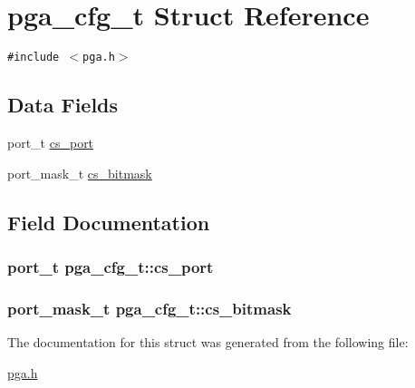 \hypertarget{structpga__cfg__t}{
\section{pga\_\-cfg\_\-t Struct Reference}
\label{structpga__cfg__t}
}
{\tt \#include $<$pga.h$>$}

\subsection*{Data Fields}
\begin{CompactItemize}
\item 
port\_\-t \hyperlink{structpga__cfg__t_7edba9c35b8d722453bd5f6ad115944c}{cs\_\-port}
\item 
port\_\-mask\_\-t \hyperlink{structpga__cfg__t_f6e985a57c66090aab373ce936c7c16d}{cs\_\-bitmask}
\end{CompactItemize}


\subsection{Field Documentation}
\hypertarget{structpga__cfg__t_7edba9c35b8d722453bd5f6ad115944c}{
\subsubsection{\setlength{\rightskip}{0pt plus 5cm}port\_\-t {\bf pga\_\-cfg\_\-t::cs\_\-port}}}
\label{structpga__cfg__t_7edba9c35b8d722453bd5f6ad115944c}


\hypertarget{structpga__cfg__t_f6e985a57c66090aab373ce936c7c16d}{
\subsubsection{\setlength{\rightskip}{0pt plus 5cm}port\_\-mask\_\-t {\bf pga\_\-cfg\_\-t::cs\_\-bitmask}}}
\label{structpga__cfg__t_f6e985a57c66090aab373ce936c7c16d}




The documentation for this struct was generated from the following file:\begin{CompactItemize}
\item 
\hyperlink{pga_8h}{pga.h}\end{CompactItemize}
